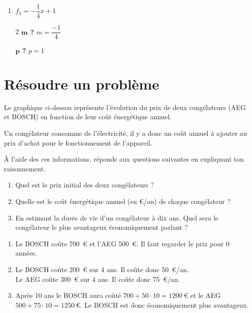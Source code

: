 \documentclass[a4paper, 12pt, parskip=half-]{scrartcl}
\begin{document}
\begin{solution}
\begin{enumerate}
\begin{multicols}{2}
                  \textbf{$\bm{p}$ ?}
                  \medbreak
                  $f_4$ est linéaire $\Rightarrow p=0$
              \end{multicols}
        \item $f_5 = -\dfrac{1}{4}x + 1 $
              \begin{multicols}{2}
                  \textbf{$\bm{m}$ ?}
                  \medbreak
                  $m=\dfrac{-1}{4}$
                  \columnbreak

                  \textbf{$\bm{p}$ ?}
                  \medbreak
                  $p=1$
              \end{multicols}
    \end{enumerate}
    \newpage
\end{solution}
\section*{ Résoudre un problème}
\begin{exercise}[points=4]
    Le graphique ci-dessou représente l'évolution du prix de deux congélateurs (AEG et BOSCH) en fonction de leur coût énergétique annuel. 
    
    Un congélateur consomme de l'électricité, il y a donc un coût annuel à ajouter au prix d'achat pour le fonctionnement de l'appareil.
    
    À l'aide des ces informations, réponds aux questions suivantes en expliquant ton raisonnement.
    \begin{enumerate}
        \item Quel est le prix initial des deux congélateurs ?
        \item Quelle est le coût énergétique annuel (en €/an) de chaque congélateur ?
        \item En estimant la durée de vie d'un congélateur à dix ans. Quel sera le congélateur le plus avantageux économiquement parlant ?
    \end{enumerate}
    \begin{center}
        
    \end{center}
\end{exercise}
\begin{solution}
    \begin{enumerate}
        \item Le BOSCH coûte 700~€ et l'AEG 500~€. Il faut regarder le prix pour 0 années.
        \item Le BOSCH coûte 200~€ sur 4 ans. Il coûte donc 50~€/an.\\
        Le AEG coûte 300~€ sur 4 ans. Il coûte donc 75~€/an.
        \item Après 10 ans le BOSCH aura coûté $700 + 50\cdot 10 = 1200~€$ et le AEG $500 + 75\cdot 10 = 1250~€$. Le BOSCH est donc économiquement plus avantageux.
    \end{enumerate}
\end{solution}
\end{document}
